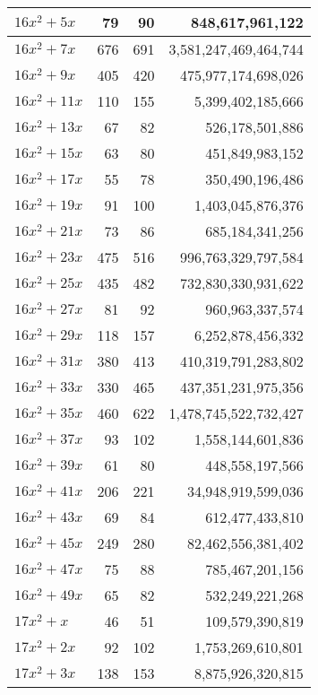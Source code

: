 \documentclass[a4paper]{amsproc}
\theoremstyle{plain}
\theoremstyle{named}
\begin{document}
\begin{longtable}{ | l | r | r | r | }
$16x^2 + 5x$ & 79 & 90 & 848{,}617{,}961{,}122 \\ \hline
$16x^2 + 7x$ & 676 & 691 & 3{,}581{,}247{,}469{,}464{,}744 \\ \hline
$16x^2 + 9x$ & 405 & 420 & 475{,}977{,}174{,}698{,}026 \\ \hline
$16x^2 + 11x$ & 110 & 155 & 5{,}399{,}402{,}185{,}666 \\ \hline
$16x^2 + 13x$ & 67 & 82 & 526{,}178{,}501{,}886 \\ \hline
$16x^2 + 15x$ & 63 & 80 & 451{,}849{,}983{,}152 \\ \hline
$16x^2 + 17x$ & 55 & 78 & 350{,}490{,}196{,}486 \\ \hline
$16x^2 + 19x$ & 91 & 100 & 1{,}403{,}045{,}876{,}376 \\ \hline
$16x^2 + 21x$ & 73 & 86 & 685{,}184{,}341{,}256 \\ \hline
$16x^2 + 23x$ & 475 & 516 & 996{,}763{,}329{,}797{,}584 \\ \hline
$16x^2 + 25x$ & 435 & 482 & 732{,}830{,}330{,}931{,}622 \\ \hline
$16x^2 + 27x$ & 81 & 92 & 960{,}963{,}337{,}574 \\ \hline
$16x^2 + 29x$ & 118 & 157 & 6{,}252{,}878{,}456{,}332 \\ \hline
$16x^2 + 31x$ & 380 & 413 & 410{,}319{,}791{,}283{,}802 \\ \hline
$16x^2 + 33x$ & 330 & 465 & 437{,}351{,}231{,}975{,}356 \\ \hline
$16x^2 + 35x$ & 460 & 622 & 1{,}478{,}745{,}522{,}732{,}427 \\ \hline
$16x^2 + 37x$ & 93 & 102 & 1{,}558{,}144{,}601{,}836 \\ \hline
$16x^2 + 39x$ & 61 & 80 & 448{,}558{,}197{,}566 \\ \hline
$16x^2 + 41x$ & 206 & 221 & 34{,}948{,}919{,}599{,}036 \\ \hline
$16x^2 + 43x$ & 69 & 84 & 612{,}477{,}433{,}810 \\ \hline
$16x^2 + 45x$ & 249 & 280 & 82{,}462{,}556{,}381{,}402 \\ \hline
$16x^2 + 47x$ & 75 & 88 & 785{,}467{,}201{,}156 \\ \hline
$16x^2 + 49x$ & 65 & 82 & 532{,}249{,}221{,}268 \\ \hline
$17x^2 + x$ & 46 & 51 & 109{,}579{,}390{,}819 \\ \hline
$17x^2 + 2x$ & 92 & 102 & 1{,}753{,}269{,}610{,}801 \\ \hline
$17x^2 + 3x$ & 138 & 153 & 8{,}875{,}926{,}320{,}815 \\ \hline

\end{longtable}
\end{document}
